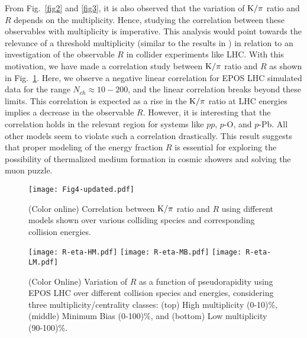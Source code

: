 \documentclass[aps,twocolumn,nofootinbib]{revtex4-1}
\begin{document}
From Fig.~\ref{fig2} and \ref{fig3}, it is also observed that the variation of $\rm{K/\pi}$ ratio and $R$ depends on the multiplicity. Hence, studying the correlation between these observables with multiplicity is imperative. This analysis would point towards the relevance of a threshold multiplicity (similar to the results in \cite{Thakur:2017kpv,Hatwar:2022cbx,Sahu:2020nbu,Sahu:2020swd}) in relation to an investigation of the observable $R$ in collider experiments like LHC. With this motivation, we have made a correlation study between $\rm{K/\pi}$ ratio and $R$ as shown in Fig.~\ref{fig4}. Here, we observe a negative linear correlation for EPOS LHC simulated data for the range $N_{ch} \approx 10 - 200 $, and the linear correlation breaks beyond these limits. This correlation is expected as a rise in the $\rm{K/\pi}$ ratio at LHC energies implies a decrease in the observable $R$. However, it is interesting that the correlation holds in the relevant region for systems like $pp$, $p$-O, and $p$-Pb. All other models seem to violate such a correlation drastically. This result suggests that proper modeling of the energy fraction $R$ is essential for exploring the possibility of thermalized medium formation in cosmic showers and solving the muon puzzle.

\begin{figure}[ht!]
\texttt{[image: Fig4-updated.pdf]}
 \caption{(Color online) Correlation between $\rm{K/\pi}$ ratio and $R$ using different models shown over various colliding species and corresponding collision energies.}
\label{fig4}
\end{figure}

\begin{figure}
\texttt{[image: R-eta-HM.pdf]}
\texttt{[image: R-eta-MB.pdf]}
\texttt{[image: R-eta-LM.pdf]}
\caption{(Color Online) Variation of $R$ as a function of pseudorapidity using EPOS LHC over different collision species and energies, considering three multiplicity/centrality classes: (top) High multiplicity (0-10)\%, (middle) Minimum Bias (0-100)\%, and (bottom) Low multiplicity (90-100)\%.}
\label{fig5}
\end{figure}
\end{document}
